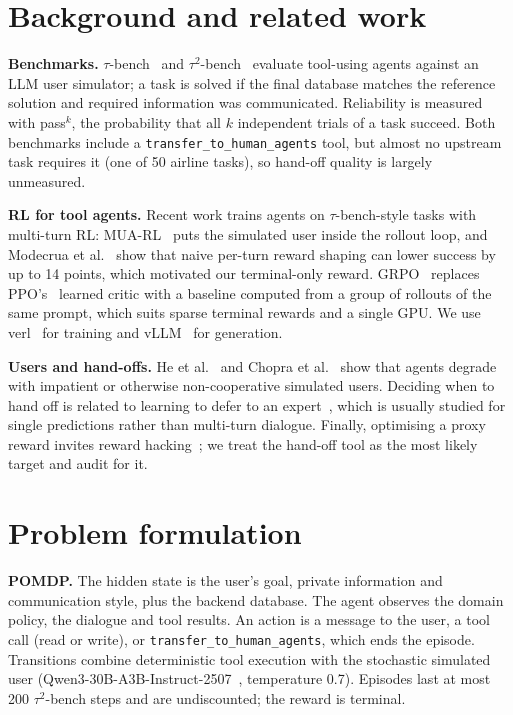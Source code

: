 \documentclass[12pt,a4paper]{article}
\newcommand{\taubench}{$\tau$-bench}
\newcommand{\tautwo}{$\tau^2$-bench}
\newcommand{\passk}[1]{pass$^{#1}$}
\begin{document}
\section{Background and related work}

\textbf{Benchmarks.} \taubench{}~\cite{yao2024} and \tautwo{}~\cite{barres2025}
evaluate tool-using agents against an LLM user simulator; a task is solved if
the final database matches the reference solution and required information
was communicated. Reliability is measured with \passk{k}, the probability that
all $k$ independent trials of a task succeed. Both benchmarks include a
\texttt{transfer\_to\_human\_agents} tool, but almost no upstream task requires
it (one of 50 airline tasks), so hand-off quality is largely unmeasured.

\textbf{RL for tool agents.} Recent work trains agents on
\taubench{}-style tasks with multi-turn RL: MUA-RL~\cite{zhao2025} puts the
simulated user inside the rollout loop, and Modecrua et al.~\cite{modecrua2026}
show that naive per-turn reward shaping can lower success by up to 14 points,
which motivated our terminal-only reward. GRPO~\cite{shao2024} replaces
PPO's~\cite{schulman2017} learned critic with a baseline computed from a group
of rollouts of the same prompt, which suits sparse terminal rewards and a
single GPU. We use verl~\cite{sheng2025} for training and vLLM~\cite{kwon2023}
for generation.

\textbf{Users and hand-offs.} He et al.~\cite{he2025} and Chopra
et al.~\cite{chopra2026} show that agents degrade with impatient or otherwise
non-cooperative simulated users. Deciding when to hand off is related to
learning to defer to an expert~\cite{madras2018,mozannar2020}, which is usually
studied for single predictions rather than multi-turn dialogue. Finally,
optimising a proxy reward invites reward hacking~\cite{amodei2016,skalse2022};
we treat the hand-off tool as the most likely target and audit for it.

\section{Problem formulation}

\textbf{POMDP.} The hidden state is the user's goal, private information and
communication style, plus the backend database. The agent observes the domain
policy, the dialogue and tool results. An action is a message to the user, a
tool call (read or write), or \texttt{transfer\_to\_human\_agents}, which ends
the episode. Transitions combine deterministic tool execution with the
stochastic simulated user (Qwen3-30B-A3B-Instruct-2507~\cite{yang2025},
temperature 0.7). Episodes last at most 200 \tautwo{} steps and are
undiscounted; the reward is terminal.
\end{document}
